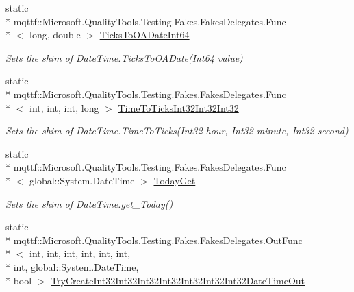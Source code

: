 \begin{DoxyCompactItemize}
static \\*
mqttf\-::\-Microsoft.\-Quality\-Tools.\-Testing.\-Fakes.\-Fakes\-Delegates.\-Func\\*
$<$ long, double $>$ \hyperlink{class_system_1_1_fakes_1_1_shim_date_time_acadbe56a84f762958aa29ebeff6748c8}{Ticks\-To\-O\-A\-Date\-Int64}
\begin{DoxyCompactList}\small\item\em Sets the shim of Date\-Time.\-Ticks\-To\-O\-A\-Date(\-Int64 value)\end{DoxyCompactList}\item 
static \\*
mqttf\-::\-Microsoft.\-Quality\-Tools.\-Testing.\-Fakes.\-Fakes\-Delegates.\-Func\\*
$<$ int, int, int, long $>$ \hyperlink{class_system_1_1_fakes_1_1_shim_date_time_a0cd759e46b67edfb3716da00c3736c03}{Time\-To\-Ticks\-Int32\-Int32\-Int32}
\begin{DoxyCompactList}\small\item\em Sets the shim of Date\-Time.\-Time\-To\-Ticks(\-Int32 hour, Int32 minute, Int32 second)\end{DoxyCompactList}\item 
static \\*
mqttf\-::\-Microsoft.\-Quality\-Tools.\-Testing.\-Fakes.\-Fakes\-Delegates.\-Func\\*
$<$ global\-::\-System.\-Date\-Time $>$ \hyperlink{class_system_1_1_fakes_1_1_shim_date_time_a45249fea7d16d2b2859b7efebf92fc90}{Today\-Get}
\begin{DoxyCompactList}\small\item\em Sets the shim of Date\-Time.\-get\-\_\-\-Today()\end{DoxyCompactList}\item 
static \\*
mqttf\-::\-Microsoft.\-Quality\-Tools.\-Testing.\-Fakes.\-Fakes\-Delegates.\-Out\-Func\\*
$<$ int, int, int, int, int, int, \\*
int, global\-::\-System.\-Date\-Time, \\*
bool $>$ \hyperlink{class_system_1_1_fakes_1_1_shim_date_time_aa4dc50ddafe6766140ef41576e00d106}{Try\-Create\-Int32\-Int32\-Int32\-Int32\-Int32\-Int32\-Int32\-Date\-Time\-Out}

\end{DoxyCompactItemize}

